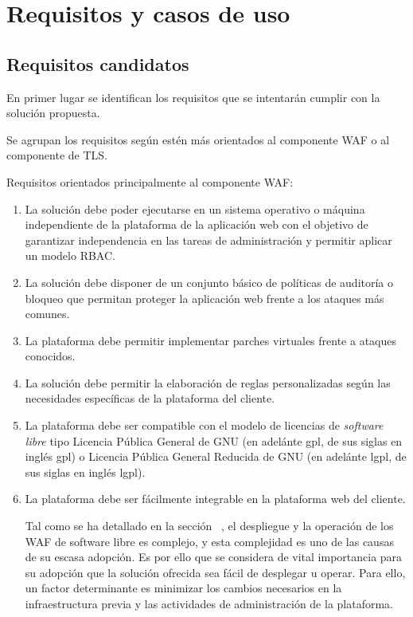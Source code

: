 \chapter{Requisitos y casos de uso}
\section{Requisitos candidatos}
\par En primer lugar se identifican los requisitos que se intentarán cumplir con la solución propuesta.
\par Se agrupan los requisitos según estén más orientados al componente WAF o al componente de TLS.
\par Requisitos orientados principalmente al componente WAF:
\begin{enumerate}
  \item \label{req:independence} La solución debe poder ejecutarse en un sistema operativo o máquina independiente de la plataforma de la aplicación web con el
    objetivo de garantizar independencia en las tareas de administración y permitir aplicar un modelo RBAC.

  \item \label{req:commonattacks} La solución debe disponer de un conjunto básico de políticas de auditoría o bloqueo que permitan proteger la aplicación web
    frente a los ataques más comunes.

  \item La plataforma debe permitir implementar parches virtuales frente a ataques conocidos.

  \item La solución debe permitir la elaboración de reglas personalizadas según las necesidades específicas de la plataforma del cliente.

  \item \label{req:softwarelibre} La plataforma debe ser compatible con el modelo de licencias de {\em software libre\cite{softwarelibre}} tipo Licencia Pública
    General de GNU (en adelánte \acrshort{gpl}, de  sus siglas en inglés \acrlong{gpl}) o Licencia Pública General Reducida de GNU (en adelánte \acrshort{lgpl},
    de sus siglas en inglés \acrlong{lgpl}).

  \item \label{req:facilidad} La plataforma debe ser fácilmente integrable en la plataforma web del cliente.
    \par Tal como se ha detallado en la sección ~, el despliegue y la operación de los WAF de software libre es complejo, y esta complejidad es uno de las causas de su escasa adopción. Es por ello que se considera de
    vital importancia para su adopción que la solución ofrecida sea fácil de desplegar u operar. Para ello, un factor determinante es minimizar los cambios necesarios en la infraestructura previa y  las actividades de administración de la
    plataforma.


\end{enumerate}
